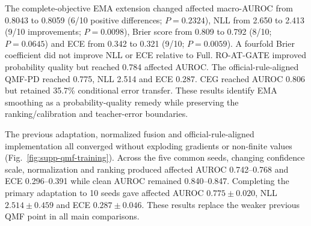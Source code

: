 \documentclass[10pt]{article}
\begin{document}
\begin{table}[H]
\centering
\caption{Prediction-level teacher-safeguard audit on the five seeds shared with the original clean-teacher conditional analysis. CRA active coverage includes the valid affected-group-removal requirement. CEG is a training rule and has no label-free test-time coverage. Recovery and transfer rates are conditional paired associations, not causal effects.}
\label{tab:supp-agreement}
\resizebox{\textwidth}{!}{}
\end{table}

The complete-objective EMA extension changed affected macro-AUROC from 0.8043 to 0.8059 (6/10 positive differences; $P=0.2324$), NLL from 2.650 to 2.413 (9/10 improvements; $P=0.0098$), Brier score from 0.809 to 0.792 (8/10; $P=0.0645$) and ECE from 0.342 to 0.321 (9/10; $P=0.0059$). A fourfold Brier coefficient did not improve NLL or ECE relative to Full. RO-AT-GATE improved probability quality but reached 0.784 affected AUROC. The official-rule-aligned QMF-PD reached 0.775, NLL 2.514 and ECE 0.287. CEG reached AUROC 0.806 but retained 35.7\% conditional error transfer. These results identify EMA smoothing as a probability-quality remedy while preserving the ranking/calibration and teacher-error boundaries.

\begin{table}[H]
\centering
\caption{Original QMF implementation choices and their sensor-group adaptation. The primary adaptation aligns confidence scale, detached unnormalized fusion, cumulative history and unit ranking weight with the published implementation; task-specific backbones are not reproduced.}
\label{tab:supp-qmf-implementation}
\resizebox{0.98\textwidth}{!}{}
\end{table}

\begin{table}[H]
\centering
\caption{QMF-specific fairness and hyperparameter sensitivity. Clean results use the clean view with exactly the same availability mask as the faulted view. The primary official-rule-aligned adaptation uses 10 seeds; the controlled variants use five common seeds. Lower NLL and ECE are better.}
\label{tab:supp-qmf-sensitivity}
\resizebox{\textwidth}{!}{}
\end{table}

The previous adaptation, normalized fusion and official-rule-aligned implementation all converged without exploding gradients or non-finite values (Fig.~\ref{fig:supp-qmf-training}). Across the five common seeds, changing confidence scale, normalization and ranking produced affected AUROC 0.742--0.768 and ECE 0.296--0.391 while clean AUROC remained 0.840--0.847. Completing the primary adaptation to 10 seeds gave affected AUROC $0.775\pm0.020$, NLL $2.514\pm0.459$ and ECE $0.287\pm0.046$. These results replace the weaker previous QMF point in all main comparisons.
\end{document}
